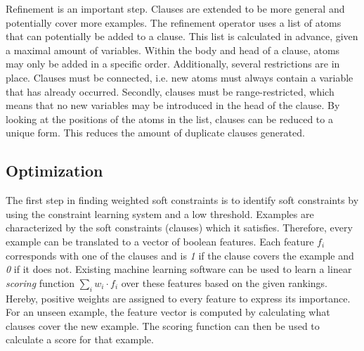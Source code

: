 \documentclass{llncs}
\begin{document}
Refinement is an important step.
Clauses are extended to be more general and potentially cover more examples.
The refinement operator uses a list of atoms that can potentially be added to a clause.
This list is calculated in advance, given a maximal amount of variables.
Within the body and head of a clause, atoms may only be added in a specific order.
Additionally, several restrictions are in place.
Clauses must be connected, i.e. new atoms must always contain a variable that has already occurred.
Secondly, clauses must be range-restricted, which means that no new variables may be introduced in the head of the clause.
By looking at the positions of the atoms in the list, clauses can be reduced to a unique form.
This reduces the amount of duplicate clauses generated.

\subsection{Optimization}
The first step in finding weighted soft constraints is to identify soft constraints by using the constraint learning system and a low threshold.
Examples are characterized by the soft constraints (clauses) which it satisfies.
Therefore, every example can be translated to a vector of boolean features.
Each feature $f_i$ corresponds with one of the clauses and is \emph{1} if the clause covers the example and \emph{0} if it does not.
Existing machine learning software can be used to learn a linear \emph{scoring} function $\sum_i w_i \cdot f_i$ over these features based on the given rankings.
Hereby, positive weights are assigned to every feature to express its importance.
For an unseen example, the feature vector is computed by calculating what clauses cover the new example.
The scoring function can then be used to calculate a score for that example.
\end{document}
